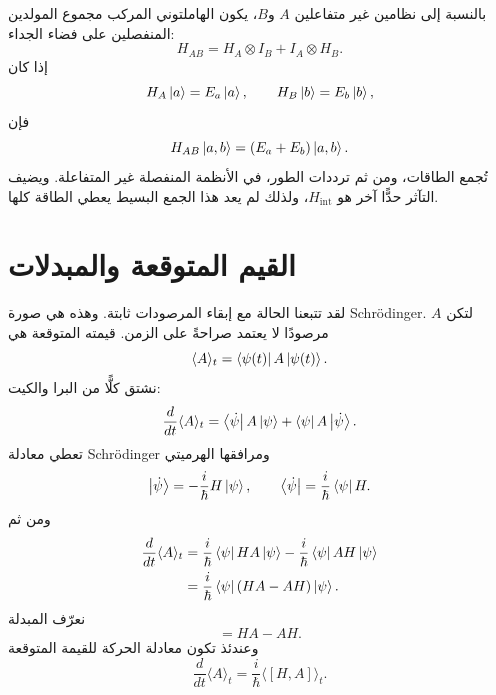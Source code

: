 بالنسبة إلى نظامين غير متفاعلين \(A\) و\(B\)، يكون الهاملتوني المركب مجموع المولدين المنفصلين على فضاء الجداء:
\begin{equation}
H_{AB}
=
H_A\otimes I_B+I_A\otimes H_B.
\end{equation}
إذا كان
\begin{equation}
H_A\left\lvert a\right\rangle=E_a\left\lvert a\right\rangle,
\qquad
H_B\left\lvert b\right\rangle=E_b\left\lvert b\right\rangle,
\end{equation}
فإن
\begin{equation}
H_{AB}\left\lvert a,b\right\rangle=(E_a+E_b)\left\lvert a,b\right\rangle.
\end{equation}
تُجمع الطاقات، ومن ثم ترددات الطور، في الأنظمة المنفصلة غير المتفاعلة. ويضيف التآثر حدًّا آخر هو \(H_{\mathrm{int}}\)، ولذلك لم يعد هذا الجمع البسيط يعطي الطاقة كلها.

\begin{classroomqa}
\end{classroomqa}

\section{القيم المتوقعة والمبدلات}

لقد تتبعنا الحالة مع إبقاء المرصودات ثابتة. وهذه هي صورة Schr\"odinger. لتكن \(A\) مرصودًا لا يعتمد صراحةً على الزمن. قيمته المتوقعة هي
\begin{equation}
\langle A\rangle_t
=
\left\langle\psi(t)\right\rvert A\left\lvert\psi(t)\right\rangle.
\end{equation}
نشتق كلًّا من البرا والكيت:
\begin{equation}
\frac{d}{dt}\langle A\rangle_t
=
\left\langle\dot\psi\right\rvert A\left\lvert\psi\right\rangle
+
\left\langle\psi\right\rvert A\left\lvert\dot\psi\right\rangle.
\end{equation}
تعطي معادلة Schr\"odinger ومرافقها الهرميتي
\begin{equation}
\left\lvert\dot\psi\right\rangle
=-\frac{i}{\hbar}H\left\lvert\psi\right\rangle,
\qquad
\left\langle\dot\psi\right\rvert
=\frac{i}{\hbar}\left\langle\psi\right\rvert H.
\end{equation}
ومن ثم
\begin{align}
\frac{d}{dt}\langle A\rangle_t
&=
\frac{i}{\hbar}\left\langle\psi\right\rvert HA\left\lvert\psi\right\rangle
-\frac{i}{\hbar}\left\langle\psi\right\rvert AH\left\lvert\psi\right\rangle \\
&=
\frac{i}{\hbar}\left\langle\psi\right\rvert(HA-AH)\left\lvert\psi\right\rangle.
\end{align}
نعرّف المبدلة
\begin{equation}
[H,A]=HA-AH.
\end{equation}
وعندئذ تكون معادلة الحركة للقيمة المتوقعة
\begin{equation}
\boxed{
\frac{d}{dt}\langle A\rangle_t
=
\frac{i}{\hbar}\langle[H,A]\rangle_t
}.
\end{equation}

